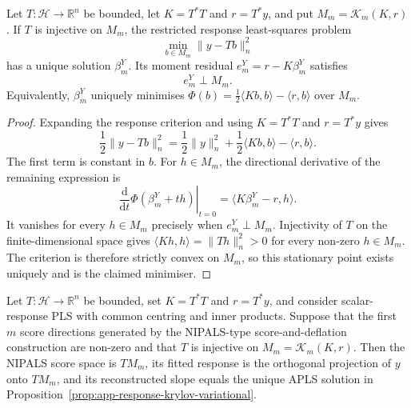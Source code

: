 \begin{proposition}
\label{prop:app-response-krylov-variational}
Let $T:\mathcal H\to\mathbb R^n$ be bounded, let $K=T^*T$ and $r=T^*y$,
and put $M_m=\mathcal K_m(K,r)$.  If $T$ is injective on $M_m$, the
restricted response least-squares problem
\[
    \min_{b\in M_m}\|y-Tb\|_n^2
\]
has a unique solution $\beta_m^Y$.  Its moment residual
$e_m^Y=r-K\beta_m^Y$ satisfies
\[
    e_m^Y\perp M_m.
\]
Equivalently, $\beta_m^Y$ uniquely minimises
$\Phi(b)=\frac12\langle Kb,b\rangle-\langle r,b\rangle$ over $M_m$.
\end{proposition}

\begin{proof}
Expanding the response criterion and using $K=T^*T$ and $r=T^*y$ gives
\[
 \frac12\|y-Tb\|_n^2
 =\frac12\|y\|_n^2
  +\frac12\langle Kb,b\rangle-\langle r,b\rangle.
\]
The first term is constant in $b$.  For $h\in M_m$, the directional
derivative of the remaining expression is
\[
 \left.\frac{\mathrm d}{\mathrm dt}\Phi(\beta_m^Y+th)\right|_{t=0}
 =\langle K\beta_m^Y-r,h\rangle.
\]
It vanishes for every $h\in M_m$ precisely when $e_m^Y\perp M_m$.
Injectivity of $T$ on the finite-dimensional space gives
$\langle Kh,h\rangle=\|Th\|_n^2>0$ for every non-zero $h\in M_m$.
The criterion is therefore strictly convex on $M_m$, so this stationary point
exists uniquely and is the claimed minimiser.
\end{proof}

\begin{proposition}
\label{prop:app-nipals-apls-equivalence}
Let $T:\mathcal H\to\mathbb R^n$ be bounded, set $K=T^*T$ and $r=T^*y$,
and consider scalar-response PLS with common centring and inner products.
Suppose that the first $m$ score directions generated by the NIPALS-type
score-and-deflation construction are non-zero and that $T$ is injective on
$M_m=\mathcal K_m(K,r)$.  Then the NIPALS score space is $T M_m$, its fitted
response is the orthogonal projection of $y$ onto $T M_m$, and its
reconstructed slope equals the unique APLS solution in
Proposition~\ref{prop:app-response-krylov-variational}.
\end{proposition}


